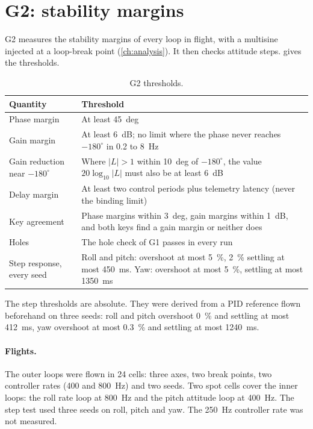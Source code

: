 \section{G2: stability margins}\label{sec:val_g2}

G2 measures the stability margins of every loop in flight, with a multisine injected at a loop-break point (\cref{ch:analysis}).
It then checks attitude steps.
 gives the thresholds.

\begin{table}[tbp]
\caption{G2 thresholds.}\label{tab:val_g2_tests}
\centering
\small
\begin{tabularx}{\textwidth}{@{}L{4.2cm} Y@{}}
\toprule
Quantity & Threshold \\
\midrule
Phase margin & At least 45~deg \\
Gain margin & At least 6~dB; no limit where the phase never reaches $-180^\circ$ in 0.2 to 8~Hz \\
Gain reduction near $-180^\circ$ & Where $|L|>1$ within 10~deg of $-180^\circ$, the value $20\log_{10}|L|$ must also be at least 6~dB \\
Delay margin & At least two control periods plus telemetry latency (never the binding limit) \\
Key agreement & Phase margins within 3~deg, gain margins within 1~dB, and both keys find a gain margin or neither does \\
Holes & The hole check of G1 passes in every run \\
Step response, every seed & Roll and pitch: overshoot at most 5~\%, 2~\% settling at most 450~ms. Yaw: overshoot at most 5~\%, settling at most 1350~ms \\
\bottomrule
\end{tabularx}
\end{table}

The step thresholds are absolute.
They were derived from a PID reference flown beforehand on three seeds: roll and pitch overshoot 0~\% and settling at most 412~ms, yaw overshoot at most 0.3~\% and settling at most 1240~ms.

\paragraph{Flights.}
The outer loops were flown in 24 cells: three axes, two break points, two controller rates (400 and 800~Hz) and two seeds.
Two spot cells cover the inner loops: the roll rate loop at 800~Hz and the pitch attitude loop at 400~Hz.
The step test used three seeds on roll, pitch and yaw.
The 250~Hz controller rate was not measured.

